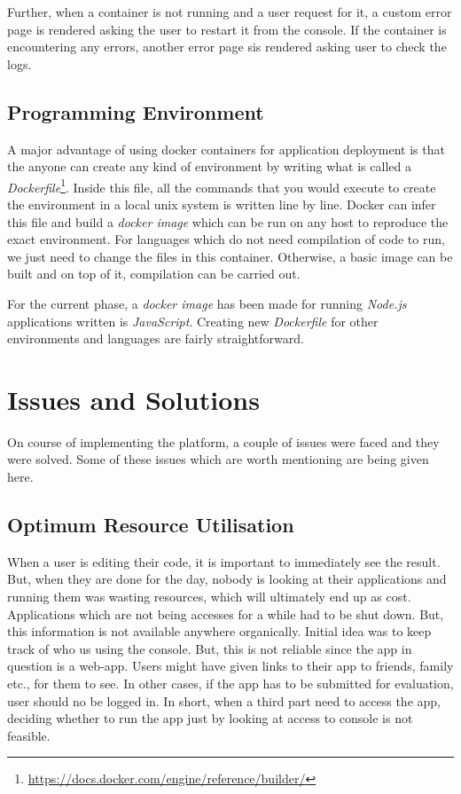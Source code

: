 \documentclass[DD]{iitmdiss}
\begin{document}
Further, when a container is not running and a user request for it, a custom error page is rendered asking the user to restart it from the console. If the container is encountering any errors, another error page sis rendered  asking user to check the logs.

\subsection{Programming Environment}
A major advantage of using docker containers for application deployment is that the anyone can create any kind of environment by writing what is called a \textit{Dockerfile}\footnote{\url{https://docs.docker.com/engine/reference/builder/}}. Inside this file, all the commands that you would execute to create the environment in a local unix system is written line by line. Docker can infer this file and build a \textit{docker image} which can be run on any host to reproduce the exact environment. For languages which do not need compilation of code to run, we just need to change the files in this container. Otherwise, a basic image can be built and on top of it, compilation can be carried out.

For the current phase, a \textit{docker image} has been made for running \textit{Node.js} applications written is \textit{JavaScript}. Creating new \textit{Dockerfile} for other environments and languages are fairly straightforward.

\section{Issues and Solutions}
On course of implementing the platform, a couple of issues were faced and they were solved. Some of these issues which are worth mentioning are being given here.

\subsection{Optimum Resource Utilisation}
When a user is editing their code, it is important to immediately see the result. But, when they are done for the day, nobody is looking at their applications and running them was wasting resources, which will ultimately end up as cost. Applications which are not being accesses for a while had to be shut down. But, this information is not available anywhere organically. Initial idea was to keep track of who us using the console. But, this is not reliable since the app in question is a web-app. Users might have given links to their app to friends, family etc., for them to see. In other cases, if the app has to be submitted for evaluation, user should no be logged in. In short, when a third part need to access the app, deciding whether to run the app just by looking at access to console is not feasible.
\end{document}
